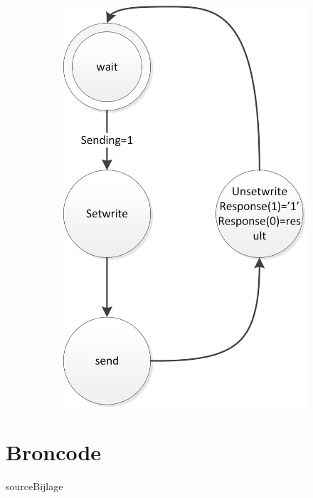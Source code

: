 \documentclass{report}
\begin{document}
\begin{figure}[H]
\begin{subfigure}{0.20\linewidth}
\includegraphics[width=\linewidth]{FSMSender}
\end{subfigure}
\end{figure}

\section{Broncode}
{sourceBijlage}
\end{document}
